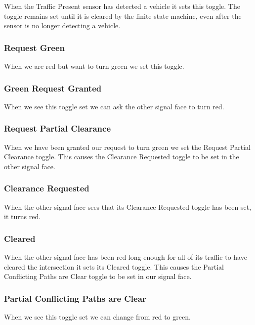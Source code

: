 \documentclass[letterpaper,twoside]{article}
\begin{document}
When the Traffic Present sensor has detected a vehicle
it sets this toggle.  The toggle remains set until it is cleared
by the finite state machine, even after the sensor is no longer
detecting a vehicle.

\subsubsection{Request Green}

When we are red but want to turn green we set this toggle.

\subsubsection{Green Request Granted}

When we see this toggle set we can ask the other signal
face to turn red.

\subsubsection{Request Partial Clearance}

When we have been granted our request to turn green we set
the Request Partial Clearance toggle.  This causes the Clearance Requested
toggle to be set in the other signal face.

\subsubsection{Clearance Requested}

When the other signal face sees that its Clearance Requested toggle has been
set, it turns red.

\subsubsection{Cleared}

When the other signal face has been red long enough for all of its traffic
to have cleared the intersection it sets its Cleared toggle.
This causes the Partial Conflicting Paths are Clear toggle to be set
in our signal face.

\subsubsection{Partial Conflicting Paths are Clear}

When we see this toggle set we can change from red to green.
\end{document}
